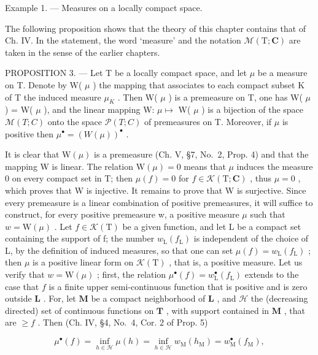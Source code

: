 Example 1. --- Measures on a locally compact space.

The following proposition shows that the theory of this chapter contains that of Ch. IV. In the statement, the word `measure' and the notation \(\mathcal{M}(\mathrm{T};\mathbf{C})\) are taken in the sense of the earlier chapters.

PROPOSITION 3. --- Let T be a locally compact space, and let \(\mu\) be a measure on T. Denote by W( \(\mu\) ) the mapping that associates to each compact subset K of T the induced measure \(\mu_{K}\) . Then W( \(\mu\) ) is a premeasure on T, one has W(\textbar{} \(\mu\) \textbar) = \textbar W( \(\mu\) )\textbar, and the linear mapping W: \(\mu \mapsto\) W( \(\mu\) ) is a bijection of the space \(\mathcal{M}(T;C)\) onto the space \(\mathcal{P}(T;C)\) of premeasures on T. Moreover, if \(\mu\) is positive then \(\mu^{\bullet} = (W(\mu))^{\bullet}\) .

It is clear that \(\mathrm{W}(\mu)\) is a premeasure (Ch. V, §7, No.~2, Prop. 4) and that the mapping W is linear. The relation \(\mathrm{W}(\mu)=0\) means that \(\mu\) induces the measure 0 on every compact set in T; then \(\mu(f)=0\) for \(f\in\mathcal{K}(\mathrm{T};\mathbf{C})\) , thus \(\mu=0\) , which proves that W is injective. It remains to prove that W is surjective. Since every premeasure is a linear combination of positive premeasures, it will suffice to construct, for every positive premeasure w, a positive measure \(\mu\) such that \(w=\mathrm{W}(\mu)\) . Let \(f\in\mathcal{K}(\mathrm{T})\) be a given function, and let L be a compact set containing the support of f; the number \(w_{\mathrm{L}}(f_{\mathrm{L}})\) is independent of the choice of L, by the definition of induced measures, so that one can set \(\mu(f)=w_{\mathrm{L}}(f_{\mathrm{L}})\) ; then \(\mu\) is a positive linear form on \(\mathcal{K}(\mathrm{T})\) , that is, a positive measure. Let us verify that \(w = \mathrm{W}(\mu)\) ; first, the relation \(\mu^{\bullet}(f) = w_{\mathrm{L}}^{\bullet}(f_{\mathrm{L}})\) extends to the case that \(f\) is a finite upper semi-continuous function that is positive and is zero outside \(\mathbf{L}\) . For, let \(\mathbf{M}\) be a compact neighborhood of \(\mathbf{L}\) , and \(\mathcal{H}\) the (decreasing directed) set of continuous functions on \(\mathbf{T}\) , with support contained in \(\mathbf{M}\) , that are \(\geqslant f\) . Then (Ch. IV, §4, No.~4, Cor. 2 of Prop. 5)

\[
\mu^ {\bullet} (f) = \inf _ {h \in \mathscr {H}} \mu (h) = \inf _ {h \in \mathscr {H}} w _ {\mathrm{M}} (h _ {\mathrm{M}}) = w _ {\mathrm{M}} ^ {\bullet} (f _ {\mathrm{M}}),
\]

